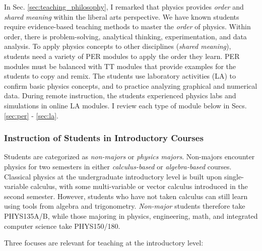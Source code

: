 \documentclass[../../../main.tex]{subfiles}
\begin{document}
In Sec. \ref{sec:teaching_philosophy}, I remarked that physics provides \textit{order} and \textit{shared meaning} within the liberal arts perspective.  We have known students require evidence-based teaching methods to master the \textit{order} of physics.  Within order, there is problem-solving, analytical thinking, experimentation, and data analysis.  To apply physics concepts to other disciplines (\textit{shared meaning}), students need a variety of PER modules to apply the order they learn.  PER modules must be balanced with TT modules that provide examples for the students to copy and remix.  The students use laboratory activities (LA) to confirm basic physics concepts, and to practice analyzing graphical and numerical data.  During remote instruction, the students experienced physics labs and simulations in online LA modules.  I review each type of module below in Secs. \ref{sec:per} - \ref{sec:la}.

\subsubsection{Instruction of Students in Introductory Courses}

Students are categorized as \textit{non-majors} or \textit{physics majors}.  Non-majors encounter physics for two semesters in either \textit{calculus-based} or \textit{algebra-based} courses.  Classical physics at the undergraduate introductory level is built upon single-variable calculus, with some multi-variable or vector calculus introduced in the second semester.  However, students who have not taken calculus can still learn using tools from algebra and trigonometry.  \textit{Non-major} students therefore take PHYS135A/B, while those majoring in physics, engineering, math, and integrated computer science take PHYS150/180.
\\
\vspace{0.25cm}

Three focuses are relevant for teaching at the introductory level:
\end{document}
